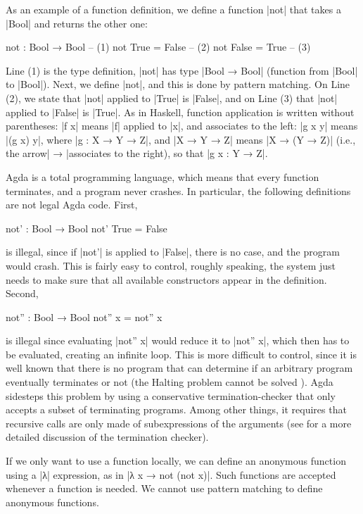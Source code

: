 As an example of a function definition, we define a function |not| that takes a |Bool| and returns the other one:
\begin{code}
not : Bool → Bool    -- (1)
not True   = False   -- (2)
not False  = True    -- (3)
\end{code}
Line (1) is the type definition, |not| has type |Bool → Bool| (function from |Bool| to |Bool|). Next, we define |not|, and this is done by pattern matching. On Line (2), we state that |not| applied to |True| is |False|, and on Line (3) that |not| applied to |False| is |True|. As in Haskell, function application is written without parentheses: |f x| means |f| applied to |x|, and associates to the left: |g x y| means |(g x) y|, where |g : X → Y → Z|, and |X → Y → Z| means |X → (Y → Z)| (i.e., the arrow\;\;\;| → |\;\;\;associates to the right), so that |g x : Y → Z|.

Agda is a total programming language, which means that every function terminates, and a program never crashes. In particular, the following definitions are not legal Agda code. First,
\begin{code}
not' : Bool → Bool
not' True = False
\end{code}
is illegal, since if |not'| is applied to |False|, there is no case, and the program would crash. This is fairly easy to control, roughly speaking, the system just needs to make sure that all available constructors appear in the definition. Second,
\begin{code}
not'' : Bool → Bool
not'' x = not'' x
\end{code}
is illegal since evaluating |not'' x| would reduce it to |not'' x|, which then has to be evaluated, creating an infinite loop. This is more difficult to control, since it is well known that there is no program that can determine if an arbitrary program eventually terminates or not (the Halting problem cannot be solved \cite{Turing}). Agda sidesteps this problem by using a conservative termination-checker that only accepts a subset of terminating programs. Among other things, it requires that recursive calls are only made of subexpressions of the arguments  (see \cite{AgdaRefManTot} for a more detailed discussion of the termination checker).

If we only want to use a function locally, we can define an anonymous function using a |λ| expression, as in |λ x → not (not x)|. Such functions are accepted whenever a function is needed. We cannot use pattern matching to define anonymous functions. 


